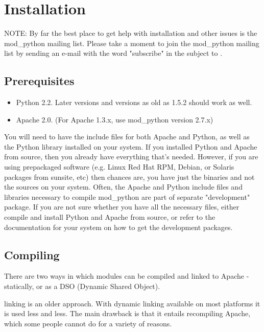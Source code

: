 \chapter{Installation\label{installation}}
NOTE: By far the best place to get help with installation and other
issues is the mod_python mailing list. Please take a moment to join
the mod_python mailing list by sending an e-mail with the word
"subscribe" in the subject to .

\section{Prerequisites\label{inst-prerequisites}}

\begin{itemize}
\item
Python 2.2. Later versions and versions as old as 1.5.2 should work as well.
\item
Apache 2.0. (For Apache 1.3.x, use mod_python version 2.7.x)
\end{itemize}

You will need to have the include files for both Apache and Python, as
well as the Python library installed on your system.  If you installed
Python and Apache from source, then you already have everything that's
needed. However, if you are using prepackaged software (e.g. Linux Red
Hat RPM, Debian, or Solaris packages from sunsite, etc) then chances
are, you have just the binaries and not the sources on your
system. Often, the Apache and Python include files and libraries
necessary to compile mod_python are part of separate "development"
package. If you are not sure whether you have all the necessary files,
either compile and install Python and Apache from source, or refer to
the documentation for your system on how to get the development
packages.

\section{Compiling\label{inst-compiling}}

There are two ways in which modules can be compiled and linked to
Apache - statically, or as a DSO (Dynamic Shared Object).

 linking is an older approach. With dynamic linking
available on most platforms it is used less and less. The main
drawback is that it entails recompiling Apache, which some people
cannot do for a variety of reasons.

